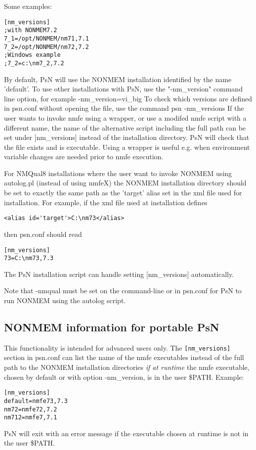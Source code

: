 Some examples:
\begin{verbatim}
[nm_versions]
;with NONMEM7.2 
7_1=/opt/NONMEM/nm71,7.1
7_2=/opt/NONMEM/nm72,7.2
;Windows example
;7_2=c:\nm7_2,7.2
\end{verbatim}
By default, PsN will use the NONMEM installation identified by the name 'default'. To use other installations with PsN, use the "-nm\_version" command line option, for example -nm\_version=vi\_big
To check which versions are defined in psn.conf without opening the file, use the command 
psn -nm\_versions
If the user wants to invoke nmfe using a wrapper, or use a modifed nmfe script with a different name, the name of the alternative script 
including the full path can be set under [nm\_versions] instead of the installation directory. PsN will check that the file exists and is executable. 
Using a wrapper is useful e.g. when environment variable changes are needed prior to nmfe execution.

For NMQual8 installations where the user want to invoke NONMEM using autolog.pl (instead of using nmfeX) 
the NONMEM installation directory should be set to exactly the same path as the 'target' alias set in the xml file used for installation. 
For example, if the xml file used at installation defines   
\begin{verbatim}
<alias id='target'>C:\nm73</alias>
\end{verbatim}
then psn.conf should read
\begin{verbatim}
[nm_versions]
73=C:\nm73,7.3
\end{verbatim}
The PsN installation script can handle setting [nm\_versions] automatically.

Note that -nmqual must be set on the command-line or in psn.conf for PsN to run NONMEM using the autolog script.

\subsection{NONMEM information for portable PsN}
This functionality is intended for advanced users only. The
\verb|[nm_versions]|
section in psn.conf can list the name of the nmfe executables instead of
the full path to the NONMEM installation directories 
\emph{if at runtime}
the nmfe executable, chosen by default or with option -nm\_version,
is in the user \$PATH. Example:
\begin{verbatim}
[nm_versions]
default=nmfe73,7.3
nm72=nmfe72,7.2
nm712=nmfe7,7.1
\end{verbatim}
PsN will exit with an error message
if the executable chosen at runtime is not
in the user \$PATH.

